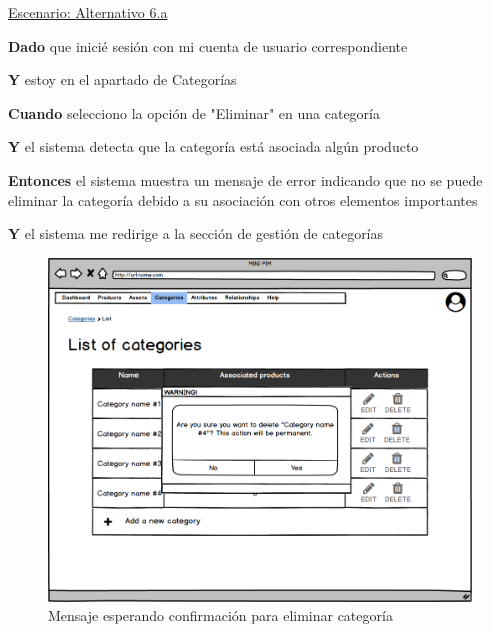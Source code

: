 \vspace{0.20cm}

\underline{Escenario: Alternativo 6.a}\par
\vspace{0.15cm}

\textbf{Dado} que inicié sesión con mi cuenta de usuario correspondiente\par
\textbf{Y} estoy en el apartado de Categorías\par
\textbf{Cuando} selecciono la opción de "Eliminar" en una categoría\par
\textbf{Y} el sistema detecta que la categoría está asociada algún producto\par
\textbf{Entonces} el sistema muestra un mensaje de error indicando que no se puede eliminar la categoría debido a su asociación con otros elementos importantes\par
\textbf{Y} el sistema me redirige a la sección de gestión de categorías\par


\vspace{0.20cm}

\begin{figure}[H]
    \includegraphics[width=1\linewidth]{mockups/RF4.4_1.png}
    \caption{Mensaje esperando confirmación para eliminar categoría}
   \end{figure}
\vspace{1.0cm}

